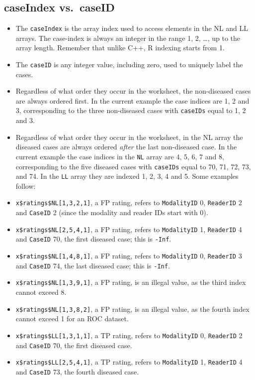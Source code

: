 \documentclass[
]{book}
\providecommand{\tightlist}{%
  \setlength{\itemsep}{0pt}\setlength{\parskip}{0pt}}
\begin{document}
\hypertarget{dataset-object-details-read-datafile-correspondence-case-index-vs-case-id}{%
\subsection{caseIndex vs.~caseID}\label{dataset-object-details-read-datafile-correspondence-case-index-vs-case-id}}

\begin{itemize}
\tightlist
\item
  The \texttt{caseIndex} is the array index used to access elements in the NL and LL arrays. The case-index is always an integer in the range 1, 2, \ldots, up to the array length. Remember that unlike C++, R indexing starts from 1.
\item
  The \texttt{caseID} is any integer value, including zero, used to uniquely label the cases.
\item
  Regardless of what order they occur in the worksheet, the non-diseased cases are always ordered first. In the current example the case indices are 1, 2 and 3, corresponding to the three non-diseased cases with \texttt{caseIDs} equal to 1, 2 and 3.
\item
  Regardless of what order they occur in the worksheet, in the NL array the diseased cases are always ordered \emph{after} the last non-diseased case. In the current example the case indices in the \texttt{NL} array are 4, 5, 6, 7 and 8, corresponding to the five diseased cases with \texttt{caseIDs} equal to 70, 71, 72, 73, and 74. In the \texttt{LL} array they are indexed 1, 2, 3, 4 and 5. Some examples follow:
\item
  \texttt{x\$ratings\$NL{[}1,3,2,1{]}}, a FP rating, refers to \texttt{ModalityID} 0, \texttt{ReaderID} 2 and \texttt{CaseID} 2 (since the modality and reader IDs start with 0).
\item
  \texttt{x\$ratings\$NL{[}2,5,4,1{]}}, a FP rating, refers to \texttt{ModalityID} 1, \texttt{ReaderID} 4 and \texttt{CaseID} 70, the first diseased case; this is \texttt{-Inf}.
\item
  \texttt{x\$ratings\$NL{[}1,4,8,1{]}}, a FP rating, refers to \texttt{ModalityID} 0, \texttt{ReaderID} 3 and \texttt{CaseID} 74, the last diseased case; this is \texttt{-Inf}.
\item
  \texttt{x\$ratings\$NL{[}1,3,9,1{]}}, a FP rating, is an illegal value, as the third index cannot exceed 8.
\item
  \texttt{x\$ratings\$NL{[}1,3,8,2{]}}, a FP rating, is an illegal value, as the fourth index cannot exceed 1 for an ROC dataset.
\item
  \texttt{x\$ratings\$LL{[}1,3,1,1{]}}, a TP rating, refers to \texttt{ModalityID} 0, \texttt{ReaderID} 2 and \texttt{CaseID} 70, the first diseased case.
\item
  \texttt{x\$ratings\$LL{[}2,5,4,1{]}}, a TP rating, refers to \texttt{ModalityID} 1, \texttt{ReaderID} 4 and \texttt{CaseID} 73, the fourth diseased case.
\end{itemize}
\end{document}
